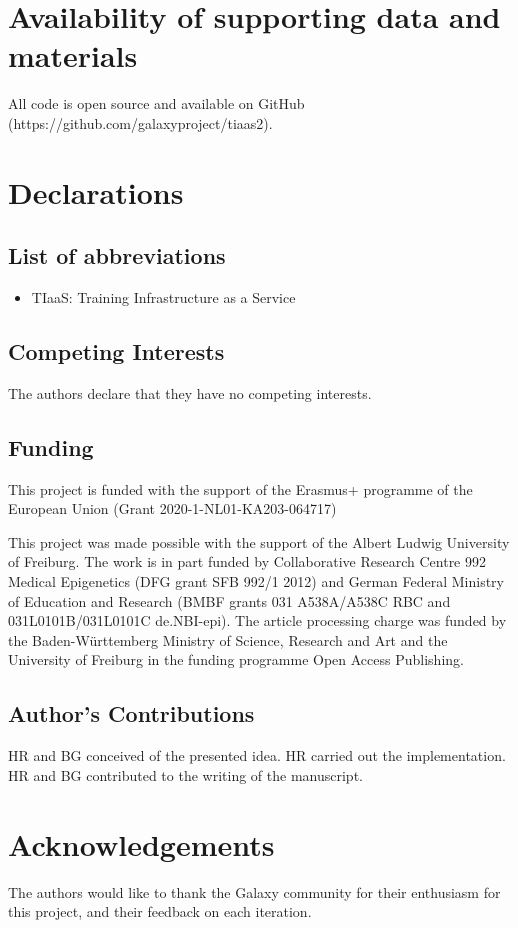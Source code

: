 \documentclass[a4paper,num-refs]{oup-contemporary}
\begin{document}
\section{Availability of supporting data and materials}
All code is open source and available on GitHub (https://github.com/galaxyproject/tiaas2).

\section{Declarations}

\subsection{List of abbreviations}
\begin{itemize}
\item TIaaS: Training Infrastructure as a Service
\end{itemize}


\subsection{Competing Interests}
The authors declare that they have no competing interests.

\subsection{Funding}
This project is funded with the support of the Erasmus+ programme of the European Union (Grant 2020-1-NL01-KA203-064717)

This project was made possible with the support of the Albert Ludwig University of Freiburg.
The work is in part funded by Collaborative Research Centre 992 Medical Epigenetics (DFG grant SFB 992/1 2012) and German Federal Ministry of Education and Research (BMBF grants 031 A538A/A538C RBC and 031L0101B/031L0101C de.NBI-epi). The article processing charge was funded by the Baden-Württemberg Ministry of Science, Research and Art and the University of Freiburg in the funding programme Open Access Publishing.

\subsection{Author's Contributions}
HR and BG conceived of the presented idea. HR carried out the implementation. HR and BG contributed to the writing of the manuscript.

\section{Acknowledgements}
The authors would like to thank the Galaxy community for their enthusiasm for this project, and their feedback on each iteration.


\end{document}
